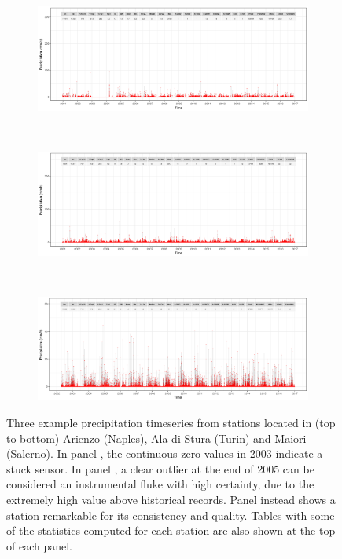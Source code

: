 \begin{figure}
    \centering
    \begin{subfigure}{\textwidth}
        \caption{}\label{fig:ts_rain/a}
        \includegraphics[width=\textwidth]{figures/rain_dst/63_ts.png}
    \end{subfigure}\\
    \begin{subfigure}{\textwidth}
        \caption{}\label{fig:ts_rain/b}
        \includegraphics[width=\textwidth]{figures/rain_dst/16_ts.png}
    \end{subfigure}\\
    \begin{subfigure}{\textwidth}
        \caption{}\label{fig:ts_rain/c}
        \includegraphics[width=\textwidth]{figures/rain_dst/613_ts.png}
    \end{subfigure}
    \decoRule
    \caption[Example precipitation timeseries from station data]{Three example precipitation timeseries from stations located in (top to bottom) Arienzo (Naples), Ala di Stura (Turin) and Maiori (Salerno). In panel , the continuous zero values in 2003 indicate a stuck sensor. In panel , a clear outlier at the end of 2005 can be considered an instrumental fluke with high certainty, due to the extremely high value above historical records. Panel  instead shows a station remarkable for its consistency and quality. Tables with some of the statistics computed for each station are also shown at the top of each panel.} \label{fig:ts_rain}
\end{figure}

